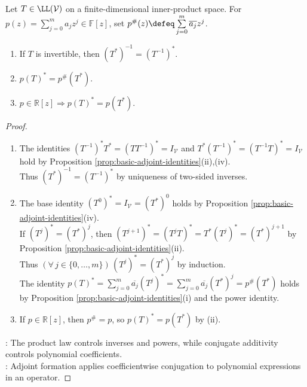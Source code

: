 \begin{proposition} \label{prop:adjoints-inverses-and-polynomials} \\
Let $T\in\LL(\mathcal{V})$ on a finite-dimensional inner-product space. For $p(z)=\sum\limits_{j=0}^{m}a_jz^j\in\mathbb{F}[z]$, set $p^{\#}(z)\defeq\sum\limits_{j=0}^{m}\overline{a_j}z^j$.
\begin{enumerate}[label=(\roman*)]
\setlength{\itemsep}{0pt}
\item If $T$ is invertible, then $(T^*)^{-1}=(T^{-1})^*$.
\item $p(T)^*=p^{\#}(T^*)$.
\item $p\in\mathbb{R}[z]\Longrightarrow p(T)^*=p(T^*)$.
\end{enumerate}
\begin{proof}
\begin{enumerate}[label=(\roman*)]
\setlength{\itemsep}{0pt}
\item The identities $(T^{-1})^*T^*=(TT^{-1})^*=I_{\mathcal{V}}$ and $T^*(T^{-1})^*=(T^{-1}T)^*=I_{\mathcal{V}}$ hold by Proposition \ref{prop:basic-adjoint-identities}(ii),(iv).\\
Thus $(T^*)^{-1}=(T^{-1})^*$ by uniqueness of two-sided inverses.
\item The base identity $(T^0)^*=I_{\mathcal{V}}=(T^*)^0$ holds by Proposition \ref{prop:basic-adjoint-identities}(iv).\\
If $(T^j)^*=(T^*)^j$, then $(T^{j+1})^*=(T^jT)^*=T^*(T^j)^*=(T^*)^{j+1}$ by Proposition \ref{prop:basic-adjoint-identities}(ii).\\
Thus $(\forall\,j\in\{0,\ldots,m\})\,(T^j)^*=(T^*)^j$ by induction.\\
The identity $p(T)^*=\sum\limits_{j=0}^{m}\overline{a_j}(T^j)^*=\sum\limits_{j=0}^{m}\overline{a_j}(T^*)^j=p^{\#}(T^*)$ holds by Proposition \ref{prop:basic-adjoint-identities}(i) and the power identity.
\item If $p\in\mathbb{R}[z]$, then $p^{\#}=p$, so $p(T)^*=p(T^*)$ by (ii).
\end{enumerate}
: The product law controls inverses and powers, while conjugate additivity controls polynomial coefficients.\\
: Adjoint formation applies coefficientwise conjugation to polynomial expressions in an operator.
\end{proof}
\end{proposition}

